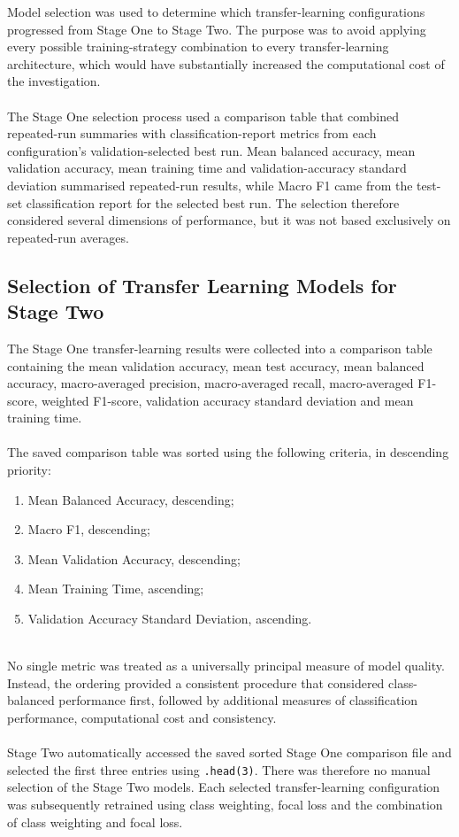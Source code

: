 \documentclass[12pt, a4paper]{report}
\let\oldsubsection\subsection
\renewcommand{\subsection}{%
    \Needspace{6\baselineskip}%
    \oldsubsection
}
\begin{document}
			Model selection was used to determine which transfer-learning configurations progressed from Stage One to Stage Two. The purpose was to avoid applying every possible training-strategy combination to every transfer-learning architecture, which would have substantially increased the computational cost of the investigation.\\\\
			The Stage One selection process used a comparison table that combined repeated-run summaries with classification-report metrics from each configuration's validation-selected best run. Mean balanced accuracy, mean validation accuracy, mean training time and validation-accuracy standard deviation summarised repeated-run results, while Macro F1 came from the test-set classification report for the selected best run. The selection therefore considered several dimensions of performance, but it was not based exclusively on repeated-run averages.
			
			\subsection{Selection of Transfer Learning Models for Stage Two}
			\label{sec:Selection_of_Transfer_Learning_Models_for_Stage_Two}
				
				The Stage One transfer-learning results were collected into a comparison table containing the mean validation accuracy, mean test accuracy, mean balanced accuracy, macro-averaged precision, macro-averaged recall, macro-averaged F1-score, weighted F1-score, validation accuracy standard deviation and mean training time.\\\\
				The saved comparison table was sorted using the following criteria, in descending priority:
				\begin{enumerate}
					\item Mean Balanced Accuracy, descending;
					\item Macro F1, descending;
					\item Mean Validation Accuracy, descending;
					\item Mean Training Time, ascending;
					\item Validation Accuracy Standard Deviation, ascending.\\\\
				\end{enumerate}
				No single metric was treated as a universally principal measure of model quality. Instead, the ordering provided a consistent procedure that considered class-balanced performance first, followed by additional measures of classification performance, computational cost and consistency.\\\\
				Stage Two automatically accessed the saved sorted Stage One comparison file and selected the first three entries using \texttt{.head(3)}. There was therefore no manual selection of the Stage Two models. Each selected transfer-learning configuration was subsequently retrained using class weighting, focal loss and the combination of class weighting and focal loss.
				
\end{document}
